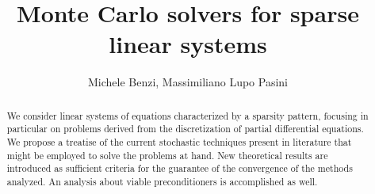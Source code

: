 \documentclass[a4paper,10pt]{article}
\title{Monte Carlo solvers for sparse linear systems}
\author{Michele Benzi, Massimiliano Lupo Pasini}
\date{}
\begin{document}
\maketitle

\begin{abstract}
We consider linear systems of equations characterized by a sparsity pattern,
focusing in particular on problems derived from the discretization of partial
differential equations. We propose a treatise of the current stochastic
techniques present in literature that might be employed to solve the problems at
hand. New theoretical results are introduced as sufficient criteria for the
guarantee of the convergence of the methods analyzed. An analysis about viable
preconditioners is accomplished as well.
\end{abstract}









\end{document}
